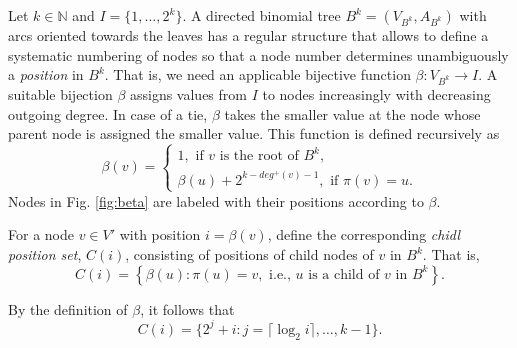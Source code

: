 Let $k\in \mathbb{N}$ and $I=\{1,\dots,2^k\}$.
A directed binomial tree $B^k=(V_{B^k},A_{B^k})$ with arcs oriented towards the leaves has a regular structure that allows to define a systematic numbering of nodes so that a node number determines unambiguously a \emph{position} in $B^k$.
That is, we need an applicable bijective function $\beta:V_{B^k}\to I$.
A suitable bijection $\beta$ assigns values from $I$ to nodes increasingly with decreasing outgoing degree.
In case of a tie, $\beta$ takes the smaller value at the node whose parent node is assigned the smaller value.
This function is defined recursively as
\begin{equation*}
\label{eq:beta}
\beta(v)=\begin{cases}
1,\text{ if } v \text{ is the root of } B^k,\\
\beta(u) + 2^{k-deg^+(v)-1}, \text{ if } \pi(v)=u.%
\end{cases}
\end{equation*}
Nodes in Fig. \ref{fig:beta} are labeled with their positions according to $\beta$.
\begin{definition}
For a node $v\in V'$ with position $i=\beta(v)$, define the corresponding \emph{chidl position set}, $C(i)$, 
consisting of positions of child nodes of $v$ in $B^k$.
That is,
$$
	C(i)=\left\{\beta(u): \pi(u)=v,\text{ i.e., } u \text{ is a child of } v \text{ in } B^k\right\}.
$$
\end{definition}
By the definition of $\beta$, it follows that 
\begin{equation}
\label{eq:c1}
C(i)=\{2^j+i:j=\lceil\log_2 i\rceil,\dots,k-1\}.
\end{equation}

